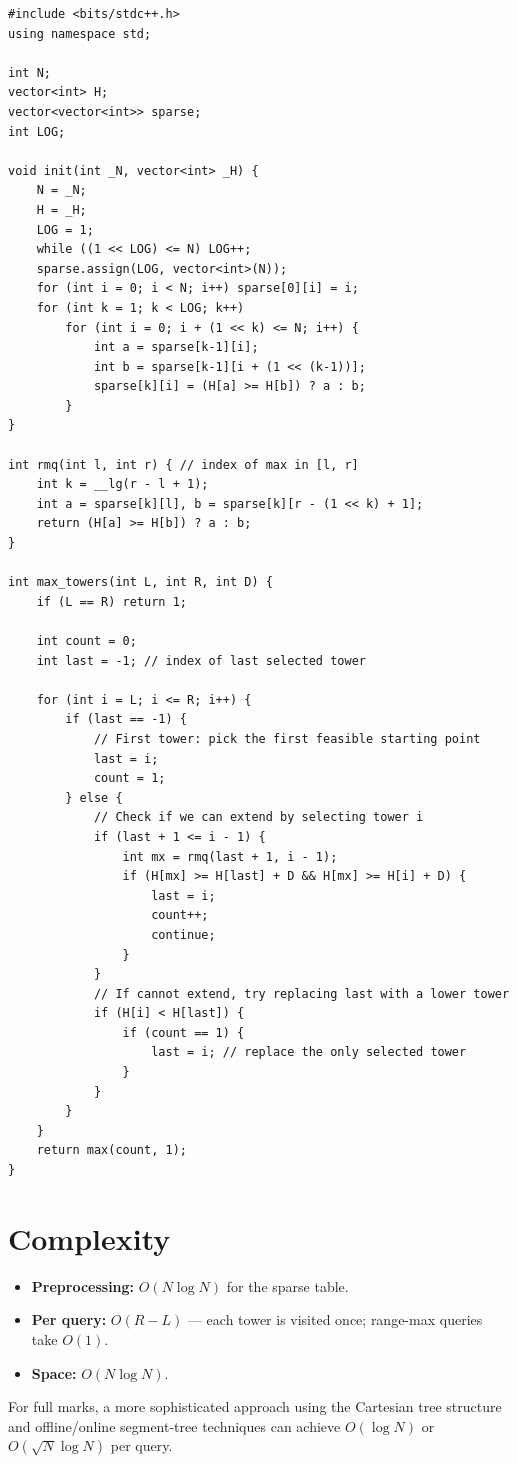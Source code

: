 \documentclass[11pt,a4paper]{article}
\begin{document}
\begin{lstlisting}
#include <bits/stdc++.h>
using namespace std;

int N;
vector<int> H;
vector<vector<int>> sparse;
int LOG;

void init(int _N, vector<int> _H) {
    N = _N;
    H = _H;
    LOG = 1;
    while ((1 << LOG) <= N) LOG++;
    sparse.assign(LOG, vector<int>(N));
    for (int i = 0; i < N; i++) sparse[0][i] = i;
    for (int k = 1; k < LOG; k++)
        for (int i = 0; i + (1 << k) <= N; i++) {
            int a = sparse[k-1][i];
            int b = sparse[k-1][i + (1 << (k-1))];
            sparse[k][i] = (H[a] >= H[b]) ? a : b;
        }
}

int rmq(int l, int r) { // index of max in [l, r]
    int k = __lg(r - l + 1);
    int a = sparse[k][l], b = sparse[k][r - (1 << k) + 1];
    return (H[a] >= H[b]) ? a : b;
}

int max_towers(int L, int R, int D) {
    if (L == R) return 1;

    int count = 0;
    int last = -1; // index of last selected tower

    for (int i = L; i <= R; i++) {
        if (last == -1) {
            // First tower: pick the first feasible starting point
            last = i;
            count = 1;
        } else {
            // Check if we can extend by selecting tower i
            if (last + 1 <= i - 1) {
                int mx = rmq(last + 1, i - 1);
                if (H[mx] >= H[last] + D && H[mx] >= H[i] + D) {
                    last = i;
                    count++;
                    continue;
                }
            }
            // If cannot extend, try replacing last with a lower tower
            if (H[i] < H[last]) {
                if (count == 1) {
                    last = i; // replace the only selected tower
                }
            }
        }
    }
    return max(count, 1);
}
\end{lstlisting}

\section{Complexity}

\begin{itemize}
  \item \textbf{Preprocessing:} $O(N \log N)$ for the sparse table.
  \item \textbf{Per query:} $O(R - L)$ --- each tower is visited once;
        range-max queries take $O(1)$.
  \item \textbf{Space:} $O(N \log N)$.
\end{itemize}

For full marks, a more sophisticated approach using the Cartesian tree
structure and offline/online segment-tree techniques can achieve
$O(\log N)$ or $O(\sqrt{N} \log N)$ per query.
\end{document}
